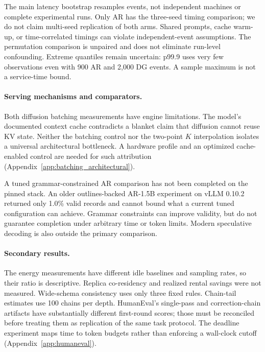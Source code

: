 The main latency bootstrap resamples events, not independent machines or
complete experimental runs. Only AR has the three-seed timing comparison;
we do not claim multi-seed replication of both arms. Shared prompts,
cache warm-up, or time-correlated timings can violate independent-event
assumptions. The permutation comparison is unpaired and does not eliminate
run-level confounding. Extreme quantiles remain uncertain: p99.9 uses very
few observations even with 900 AR and 2,000 DG events. A sample maximum
is not a service-time bound.

\paragraph{Serving mechanisms and comparators.}
Both diffusion batching measurements have engine limitations. The
model's documented context cache contradicts a blanket claim that diffusion
cannot reuse KV state. Neither the batching control nor the two-point
$K$ interpolation isolates a universal architectural bottleneck.
A hardware profile and an optimized cache-enabled control are needed for
such attribution (Appendix~\ref{app:batching_architectural}).

A tuned grammar-constrained AR comparison has not been completed on the
pinned stack. An older outlines-backed AR-1.5B experiment on vLLM 0.10.2
returned only 1.0\% valid records and cannot bound what a current tuned
configuration can achieve. Grammar constraints can improve validity, but
do not guarantee completion under arbitrary time or token limits.
Modern speculative decoding is also outside the primary comparison.

\paragraph{Secondary results.}
The energy measurements have different idle baselines and sampling rates,
so their ratio is descriptive. Replica co-residency and realized rental
savings were not measured. Wide-schema consistency uses only three fixed
rules. Chain-tail estimates use 100 chains per depth. HumanEval's
single-pass and correction-chain artifacts have substantially different
first-round scores; those must be reconciled before treating them as
replication of the same task protocol. The deadline experiment maps time
to token budgets rather than enforcing a wall-clock cutoff
(Appendix~\ref{app:humaneval}).

